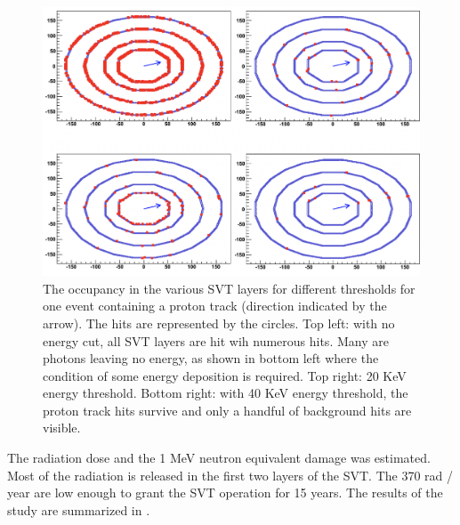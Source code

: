 \begin{figure}
	\centering
	\includegraphics[width=0.99\columnwidth,keepaspectratio]{img/bstHitDisplay.png}
	\caption{The occupancy in the various SVT layers for different thresholds for one event containing a proton track (direction indicated
             by the arrow). The hits are represented by the circles.
             Top left: with no energy cut, all SVT layers are hit wih numerous hits. Many are photons leaving no energy, as shown in
             bottom left where the condition of some energy deposition is required. Top right: 20 KeV energy threshold. Bottom right:
             with 40 KeV energy threshold, the proton track hits survive and only a handful of background hits are visible.}
	\label{fig:radStudyThreshold}
\end{figure}


The radiation dose and the 1 MeV neutron equivalent damage was estimated. Most of the radiation
is released in the first two layers of the SVT.
The 370 rad / year are low enough to grant the SVT operation for 15 years. The results of the study
are summarized in .


